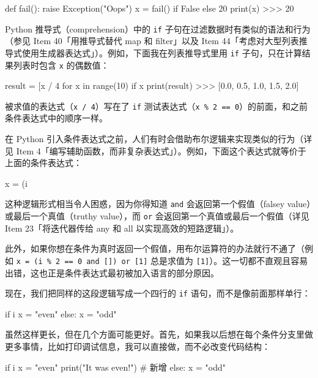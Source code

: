 \begin{codebox}[python]
def fail():
    raise Exception("Oops")
x = fail() if False else 20
print(x)
>>>
20
\end{codebox}

Python 推导式（comprehension）中的 \texttt{if} 子句在过滤数据时有类似的语法和行为（参见 Item 40「用推导式替代 map 和 filter」以及 Item 44「考虑对大型列表推导式使用生成器表达式」）。例如，下面我在列表推导式里用 \texttt{if} 子句，只在计算结果列表时包含 \texttt{x} 的偶数值：

\begin{codebox}[python]
result = [x / 4 for x in range(10) if x %
print(result)
>>>
[0.0, 0.5, 1.0, 1.5, 2.0]
\end{codebox}

被求值的表达式（\texttt{x / 4}）写在了 \texttt{if} 测试表达式（\texttt{x \% 2 == 0}）的前面，和之前条件表达式中的顺序一样。

在 Python 引入条件表达式之前，人们有时会借助布尔逻辑来实现类似的行为（详见 Item 4「编写辅助函数，而非复杂表达式」）。例如，下面这个表达式就等价于上面的条件表达式：

\begin{codebox}[python]
x = (i %
\end{codebox}

这种逻辑形式相当令人困惑，因为你得知道 \texttt{and} 会返回第一个假值（falsey value）或最后一个真值（truthy value），而 \texttt{or} 会返回第一个真值或最后一个假值（详见 Item 23「将迭代器传给 any 和 all 以实现高效的短路逻辑」）。

此外，如果你想在条件为真时返回一个假值，用布尔运算符的办法就行不通了（例如 \texttt{x = (i \% 2 == 0 and []) or [1]} 总是求值为 \texttt{[1]}）。这一切都不直观且容易出错，这也正是条件表达式最初被加入语言的部分原因。

现在，我们把同样的这段逻辑写成一个四行的 \texttt{if} 语句，而不是像前面那样单行：

\begin{codebox}[python]
if i %
    x = "even"
else:
    x = "odd"
\end{codebox}

虽然这样更长，但在几个方面可能更好。首先，如果我以后想在每个条件分支里做更多事情，比如打印调试信息，我可以直接做，而不必改变代码结构：

\begin{codebox}[python]
if i %
    x = "even"
    print("It was even!")  # 新增
else:
    x = "odd"
\end{codebox}


